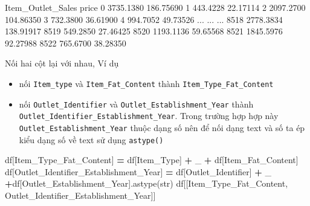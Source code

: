 \documentclass[
]{book}
\newenvironment{Shaded}{\begin{snugshade}}{\end{snugshade}}
\newcommand{\NormalTok}[1]{#1}
\newcommand{\OperatorTok}[1]{\textcolor[rgb]{0.81,0.36,0.00}{\textbf{#1}}}
\newcommand{\StringTok}[1]{\textcolor[rgb]{0.31,0.60,0.02}{#1}}
\begin{document}
\begin{Shaded}
\begin{Highlighting}[]
\NormalTok{      Item\_Outlet\_Sales      price}
\NormalTok{0             3735.1380  186.75690}
\NormalTok{1              443.4228   22.17114}
\NormalTok{2             2097.2700  104.86350}
\NormalTok{3              732.3800   36.61900}
\NormalTok{4              994.7052   49.73526}
\NormalTok{...                 ...        ...}
\NormalTok{8518          2778.3834  138.91917}
\NormalTok{8519           549.2850   27.46425}
\NormalTok{8520          1193.1136   59.65568}
\NormalTok{8521          1845.5976   92.27988}
\NormalTok{8522           765.6700   38.28350}
\end{Highlighting}
\end{Shaded}

Nối hai cột lại với nhau, Ví dụ

\begin{itemize}
\item
  nối \texttt{Item\_type} và \texttt{Item\_Fat\_Content} thành \texttt{Item\_Type\_Fat\_Content}
\item
  nối \texttt{Outlet\_Identifier} và \texttt{Outlet\_Establishment\_Year} thành \texttt{Outlet\_Identifier\_Establishment\_Year}. Trong trường hợp hợp này \texttt{Outlet\_Establishment\_Year} thuộc dạng số nên để nối dạng text và số ta ép kiểu dạng số về text sử dụng \texttt{astype()}
\end{itemize}

\begin{Shaded}
\begin{Highlighting}[]
\NormalTok{df[}\StringTok{\textquotesingle{}Item\_Type\_Fat\_Content\textquotesingle{}}\NormalTok{] }\OperatorTok{=}\NormalTok{ df[}\StringTok{\textquotesingle{}Item\_Type\textquotesingle{}}\NormalTok{] }\OperatorTok{+} \StringTok{\textquotesingle{}\_\textquotesingle{}} \OperatorTok{+}\NormalTok{ df[}\StringTok{\textquotesingle{}Item\_Fat\_Content\textquotesingle{}}\NormalTok{]}
\NormalTok{df[}\StringTok{\textquotesingle{}Outlet\_Identifier\_Establishment\_Year\textquotesingle{}}\NormalTok{] }\OperatorTok{=}\NormalTok{ df[}\StringTok{\textquotesingle{}Outlet\_Identifier\textquotesingle{}}\NormalTok{] }\OperatorTok{+} \StringTok{\textquotesingle{}\_\textquotesingle{}} \OperatorTok{+}\NormalTok{df[}\StringTok{\textquotesingle{}Outlet\_Establishment\_Year\textquotesingle{}}\NormalTok{].astype(}\StringTok{\textquotesingle{}str\textquotesingle{}}\NormalTok{)}
\NormalTok{df[[}\StringTok{\textquotesingle{}Item\_Type\_Fat\_Content\textquotesingle{}}\NormalTok{, }\StringTok{\textquotesingle{}Outlet\_Identifier\_Establishment\_Year\textquotesingle{}}\NormalTok{]]}
\end{Highlighting}
\end{Shaded}
\end{document}
